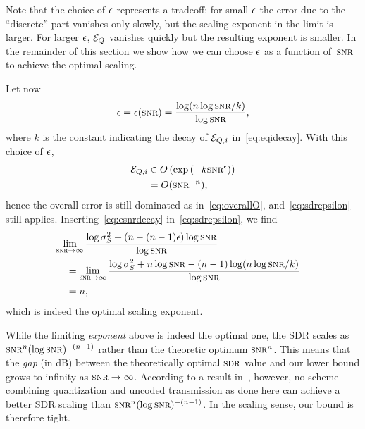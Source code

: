 Note that the choice of $\epsilon$ represents a tradeoff: for small $\epsilon$ the error due
to the ``discrete'' part vanishes only slowly, but the scaling exponent in the
limit is larger. For larger $\epsilon$, ${{\mathcal{E}}_Q}$ vanishes quickly but the resulting
exponent is smaller. In the remainder of this section we show how we can choose
$\epsilon$ as a function of~$\snr$ to achieve the optimal scaling. 

Let now
\begin{equation}
  \label{eq:esnrdecay}
  \e = \e(\snr) = \frac{\log(n \log\snr / k)}{\log\snr},
\end{equation}
where $k$ is the constant indicating the decay of ${{\mathcal{E}}_{Q,i}}$ in~\eqref{eq:eqidecay}.
With this choice of $\epsilon$,
\begin{align*}
  \Eqi &\in O\left( \exp\left( - k \snr^\e \right) \right) \\
 &= O(\snr^{-n}),
\end{align*}
hence the overall error is still dominated as in~\eqref{eq:overallO},
and~\eqref{eq:sdrepsilon} still applies. Inserting~\eqref{eq:esnrdecay}
in~\eqref{eq:sdrepsilon}, we find
\begin{align*}
  \lefteqn{ \limtoinf{\snr} \frac{\log\ssq + (n-(n-1)\e) \log\snr}{\log\snr} }
  \quad \\
  &= \limtoinf{\snr} \frac{\log\ssq + n\log\snr - (n-1)\log(n\log\snr/k)}
  {\log\snr} \\
  &= n,
\end{align*}
which is indeed the optimal scaling exponent.

\begin{remark}
  While the limiting \emph{exponent} above is indeed the optimal one, the SDR
  scales as $\snr^n (\log\snr)^{-(n-1)}$  rather than the theoretic optimum
  $\snr^n$.  This means that the \emph{gap} (in dB) between the theoretically
  optimal $\sdr$ value and our lower bound grows to infinity as $\snr \ra
  \infty$.  According to a result in~\cite{TaherzadehK2008}, however, no scheme
  combining quantization and uncoded transmission as done here can achieve a
  better SDR scaling than $\snr^n (\log\snr)^{-(n-1)}$.  In the scaling sense,
  our bound is therefore tight.
\end{remark}







